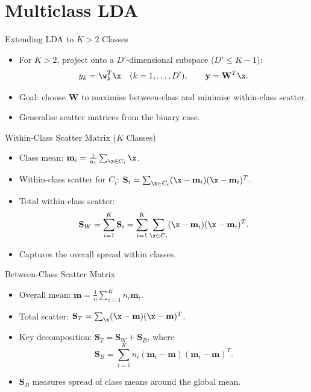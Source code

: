 \section{Multiclass LDA}

\begin{frame}{Extending LDA to $K > 2$ Classes}
  \begin{itemize}
    \item For $K > 2$, project onto a $D'$-dimensional subspace ($D' \le K-1$):
    \[
      y_k = \w_k^T\x \quad (k = 1,\ldots,D'), \qquad \mathbf{y} = \mathbf{W}^T\x.
    \]
    \item Goal: choose $\mathbf{W}$ to \alert{maximise between-class} and \alert{minimise within-class} scatter.
    \item Generalise scatter matrices from the binary case.
  \end{itemize}
\end{frame}

\begin{frame}{Within-Class Scatter Matrix ($K$ Classes)}
  \begin{itemize}
    \item Class mean: $\mathbf{m}_i = \frac{1}{n_i}\sum_{\x \in C_i}\x$.
    \item Within-class scatter for $C_i$: $\mathbf{S}_i = \sum_{\x \in C_i}(\x-\mathbf{m}_i)(\x-\mathbf{m}_i)^T$.
    \item Total within-class scatter:
    \[
      \mathbf{S}_W = \sum_{i=1}^{K}\mathbf{S}_i = \sum_{i=1}^{K}\sum_{\x \in C_i}(\x-\mathbf{m}_i)(\x-\mathbf{m}_i)^T.
    \]
    \item Captures the overall spread \alert{within} classes.
  \end{itemize}
\end{frame}

\begin{frame}{Between-Class Scatter Matrix}
  \begin{itemize}
    \item Overall mean: $\mathbf{m} = \frac{1}{n}\sum_{i=1}^{K} n_i\mathbf{m}_i$.
    \item Total scatter: $\mathbf{S}_T = \sum_{\x}(\x-\mathbf{m})(\x-\mathbf{m})^T$.
    \item Key decomposition: $\mathbf{S}_T = \mathbf{S}_W + \mathbf{S}_B$, where
    \[
      \mathbf{S}_B = \sum_{i=1}^{K} n_i(\mathbf{m}_i - \mathbf{m})(\mathbf{m}_i - \mathbf{m})^T.
    \]
    \item $\mathbf{S}_B$ measures spread of class means around the \alert{global mean}.
  \end{itemize}
\end{frame}


